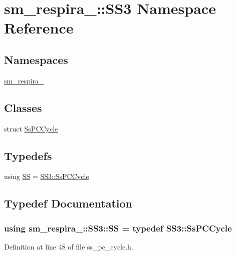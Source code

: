 \hypertarget{namespacesm__respira__1_1_1SS3}{}\section{sm\+\_\+respira\+\_\+:\+:S\+S3 Namespace Reference}
\label{namespacesm__respira__1_1_1SS3}
\subsection*{Namespaces}
\begin{DoxyCompactItemize}
\item 
 \hyperlink{namespacesm__respira__1_1_1SS3_1_1sm__respira__1}{sm\+\_\+respira\+\_}
\end{DoxyCompactItemize}
\subsection*{Classes}
\begin{DoxyCompactItemize}
\item 
struct \hyperlink{structsm__respira__1_1_1SS3_1_1SsPCCycle}{Ss\+P\+C\+Cycle}
\end{DoxyCompactItemize}
\subsection*{Typedefs}
\begin{DoxyCompactItemize}
\item 
using \hyperlink{namespacesm__respira__1_1_1SS3_aca7eacdb113aa4d7f626c75721a4899b}{SS} = \hyperlink{structsm__respira__1_1_1SS3_1_1SsPCCycle}{S\+S3\+::\+Ss\+P\+C\+Cycle}
\end{DoxyCompactItemize}


\subsection{Typedef Documentation}
\subsubsection[{\texorpdfstring{SS}{SS}}]{\setlength{\rightskip}{0pt plus 5cm}using {\bf sm\+\_\+respira\+\_\+::\+S\+S3\+::\+SS} = typedef {\bf S\+S3\+::\+Ss\+P\+C\+Cycle}}\hypertarget{namespacesm__respira__1_1_1SS3_aca7eacdb113aa4d7f626c75721a4899b}{}\label{namespacesm__respira__1_1_1SS3_aca7eacdb113aa4d7f626c75721a4899b}


Definition at line 48 of file ss\+\_\+pc\+\_\+cycle.\+h.

